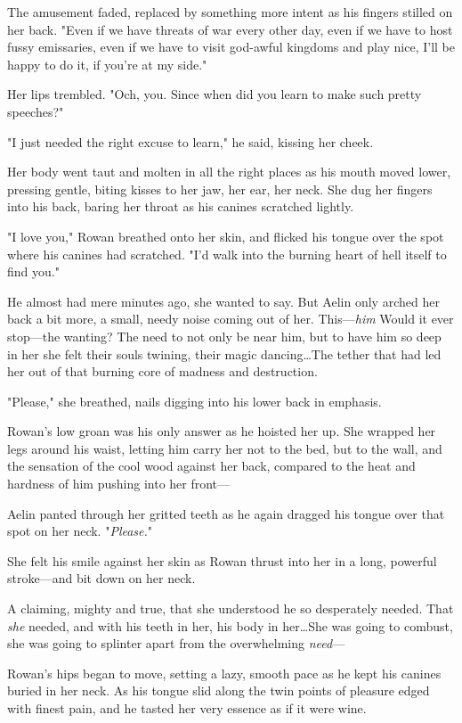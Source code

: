 The amusement faded, replaced by something more intent as his fingers stilled on her back.
"Even if we have threats of war every other day, even if we have to host fussy emissaries, even if we have to visit god-awful kingdoms and play nice, I'll be happy to do it, if you're at my side."

Her lips trembled.
"Och, you.
Since when did you learn to make such pretty speeches?"

"I just needed the right excuse to learn," he said, kissing her cheek.

Her body went taut and molten in all the right places as his mouth moved lower, pressing gentle, biting kisses to her jaw, her ear, her neck.
She dug her fingers into his back, baring her throat as his canines scratched lightly.

"I love you," Rowan breathed onto her skin, and flicked his tongue over the spot where his canines had scratched.
"I'd walk into the burning heart of hell itself to find you."

He almost had mere minutes ago, she wanted to say.
But Aelin only arched her back a bit more, a small, needy noise coming out of her.
This---\emph{him}  Would it ever stop---the wanting?
The need to not only be near him, but to have him so deep in her she felt their souls twining, their magic dancing\ldots The tether that had led her out of that burning core of madness and destruction.

"Please," she breathed, nails digging into his lower back in emphasis.

Rowan's low groan was his only answer as he hoisted her up.
She wrapped her legs around his waist, letting him carry her not to the bed, but to the wall, and the sensation of the cool wood against her back, compared to the heat and hardness of him pushing into her front---

Aelin panted through her gritted teeth as he again dragged his tongue over that spot on her neck.
"\emph{Please.}"

She felt his smile against her skin as Rowan thrust into her in a long, powerful stroke---and bit down on her neck.

A claiming, mighty and true, that she understood he so desperately needed.
That \emph{she} needed, and with his teeth in her, his body in her\ldots She was going to combust, she was going to splinter apart from the overwhelming \emph{need}---

Rowan's hips began to move, setting a lazy, smooth pace as he kept his canines buried in her neck.
As his tongue slid along the twin points of pleasure edged with finest pain, and he tasted her very essence as if it were wine.

